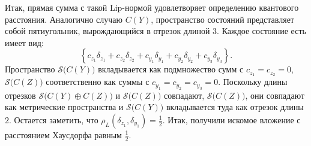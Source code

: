 \documentclass[a4paper,12pt]{article}
\begin{document}

Итак, прямая сумма с такой Lip-нормой удовлетворяет определению квантового расстояния. Аналогично случаю $ C(Y) $, пространство состояний представляет собой пятиугольник, вырождающийся в отрезок длиной $ 3 $. Каждое состояние есть имеет вид:
$$ \left\{c_{z_1}\delta_{z_1} +c_{z_2}\delta_{z_2} +c_{y_1}\delta_{y_1} +c_{y_2}\delta_{y_2} +c_{y_3}\delta_{y_3} \right\}. $$
Пространство $\mathcal{S}\big(C(Y)\big)$ вкладывается как подмножество сумм с $c_{z_1}=c_{z_2}=0 $, $ \mathcal{S}\big(C(Z)\big) $ соответственно как суммы с $c_{y_1} = c_{y_2}=c_{y_3}=0$. Поскольку длины отрезков $ \mathcal{S}\big(C(Y)\oplus C(Z)\big) $ и $ \mathcal{S}\big(C(Z)\big) $ совпадают,  $\mathcal{S}\big(C(Z)\big) $, они совпадают как метрические пространства и $ \mathcal{S}\big(C(Y)\big)  $ вкладывается туда как отрезок длины $2$. Остается заметить, что $\rho_L(\delta_{z_1},\delta_{y_1})= \frac{1}{2}$. Итак, получили искомое вложение с расстоянием Хаусдорфа равным $\frac{1}{2}$.
\end{document}
